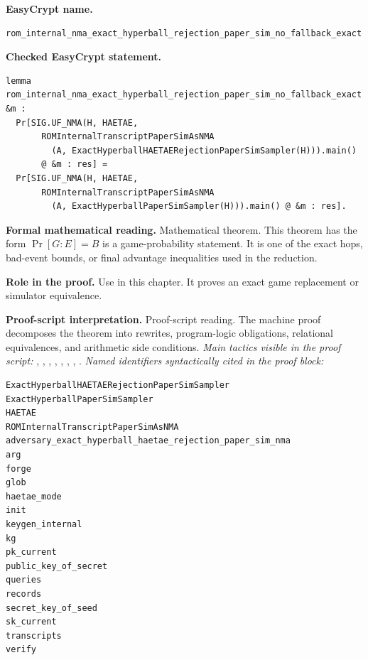 \begin{formaltheorem}
\noindent\textbf{EasyCrypt name.}
\begin{lstlisting}[language=EasyCrypt,basicstyle=\ttfamily\scriptsize]
rom_internal_nma_exact_hyperball_rejection_paper_sim_no_fallback_exact
\end{lstlisting}
\noindent\textbf{Checked EasyCrypt statement.}
\begin{lstlisting}[language=EasyCrypt,basicstyle=\ttfamily\scriptsize]
lemma rom_internal_nma_exact_hyperball_rejection_paper_sim_no_fallback_exact &m :
  Pr[SIG.UF_NMA(H, HAETAE,
       ROMInternalTranscriptPaperSimAsNMA
         (A, ExactHyperballHAETAERejectionPaperSimSampler(H))).main()
       @ &m : res] =
  Pr[SIG.UF_NMA(H, HAETAE,
       ROMInternalTranscriptPaperSimAsNMA
         (A, ExactHyperballPaperSimSampler(H))).main() @ &m : res].
\end{lstlisting}
\noindent\textbf{Formal mathematical reading.}
Mathematical theorem. This theorem has the form \(\Pr[G:E] = B\) is a game-probability statement.  It is one of the exact hops, bad-event bounds, or final advantage inequalities used in the reduction.

\noindent\textbf{Role in the proof.}
Use in this chapter. It proves an exact game replacement or simulator equivalence.

\noindent\textbf{Proof-script interpretation.}
Proof-script reading. The machine proof decomposes the theorem into rewrites, program-logic obligations, relational equivalences, and arithmetic side conditions.
\emph{Main tactics visible in the proof script:} , , , , , , , .
\emph{Named identifiers syntactically cited in the proof block:}
\begin{lstlisting}[language=EasyCrypt,basicstyle=\ttfamily\scriptsize]
ExactHyperballHAETAERejectionPaperSimSampler
ExactHyperballPaperSimSampler
HAETAE
ROMInternalTranscriptPaperSimAsNMA
adversary_exact_hyperball_haetae_rejection_paper_sim_nma
arg
forge
glob
haetae_mode
init
keygen_internal
kg
pk_current
public_key_of_secret
queries
records
secret_key_of_seed
sk_current
transcripts
verify
\end{lstlisting}

\end{formaltheorem}

